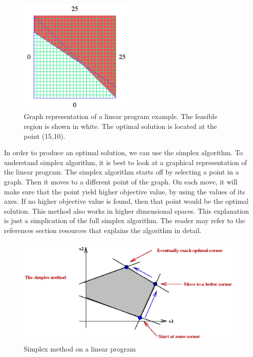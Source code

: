 \documentclass[a4paper, 12pt]{report}
\begin{document}
\begin{figure}[!ht]
  \centering
    \includegraphics[width=0.5\textwidth]{example-graph.png}
    \caption{Graph representation of a linear program example. The feasible region is shown in white. The optimal solution
  is located at the point (15,10).}
\end{figure}
In order to produce an optimal solution, we can use the simplex algorithm. To understand simplex algorithm, it is best to look at
a graphical representation of the linear program. The simplex algorithm starts off by selecting a point in a graph.
Then it moves to a different point of the graph. On each move, it will make sure that the point yield higher
objective value, by using the values of its axes. If no higher objective value is found, then that point would be the
optimal solution. This method also works in higher dimensional spaces. This explanation is just a simplication of the full
simplex algorithm. The reader may refer to the references section resources that explains the algorithm in detail.

\begin{figure}[!ht]
  \centering
    \includegraphics[width=1\textwidth]{simplex.png}
    \caption{Simplex method on a linear program}
\end{figure}
\end{document}
